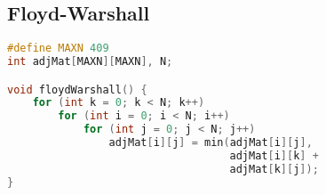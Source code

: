 \subsection{Floyd-Warshall}
\begin{lstlisting}[language=C++]
#define MAXN 409
int adjMat[MAXN][MAXN], N;

void floydWarshall() {
    for (int k = 0; k < N; k++)
        for (int i = 0; i < N; i++)
            for (int j = 0; j < N; j++)
                adjMat[i][j] = min(adjMat[i][j], 
                				   adjMat[i][k] + 
                                   adjMat[k][j]);
}
\end{lstlisting}

\newpage